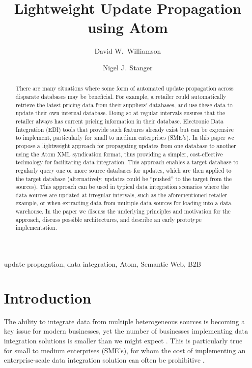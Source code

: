 \documentclass{CRPITStyle}
\title{Lightweight Update Propagation using Atom}
\author{David W.\ Williamson \and Nigel J.\ Stanger}
\affiliation{Department of Information Science, \\
	University of Otago, \\
	PO Box 56, Dunedin, New Zealand \\
	Email:~\texttt{\{dwilliamson,nstanger\}@infoscience.otago.ac.nz}}
\begin{document}
\maketitle


\begin{abstract}
There are many situations where some form of automated update
propagation across disparate databases may be beneficial. For example, a
retailer could automatically retrieve the latest pricing data from their
suppliers' databases, and use these data to update their own internal
database. Doing so at regular intervals ensures that the retailer always
has current pricing information in their database. Electronic Data
Integration (EDI) tools that provide such features already exist but can
be expensive to implement, particularly for small to medium enterprises
(SME's). In this paper we propose a lightweight approach for propagating
updates from one database to another using the Atom XML syndication
format, thus providing a simpler, cost-effective technology for
facilitating data integration. This approach enables a target database
to regularly query one or more source databases for updates, which are
then applied to the target database (alternatively, updates could be
``pushed'' to the target from the sources). This approach can be used in
typical data integration scenarios where the data sources are updated at
irregular intervals, such as the aforementioned retailer example, or
when extracting data from multiple data sources for loading into a data
warehouse. In the paper we discuss the underlying principles and
motivation for the approach, discuss possible architectures, and
describe an early prototype implementation.
\end{abstract}
\vspace{.1in}

 update propagation, data integration, Atom,
Semantic Web, B2B


\section{Introduction}
\label{sec-intro}

The ability to integrate data from multiple heterogeneous sources is
becoming a key issue for modern businesses, yet the number of businesses
implementing data integration solutions is smaller than we might expect
\cite{Beck-R-2002-Bled,vaHe-E-1999-EDI}. This is particularly true for
small to medium enterprises (SME's), for whom the cost of implementing
an enterprise-scale data integration solution can often be prohibitive
\cite{Beck-R-2002-Bled,Guo-J-2003-DocEng,Somm-RA-2002-SIGMOD}.
\end{document}
